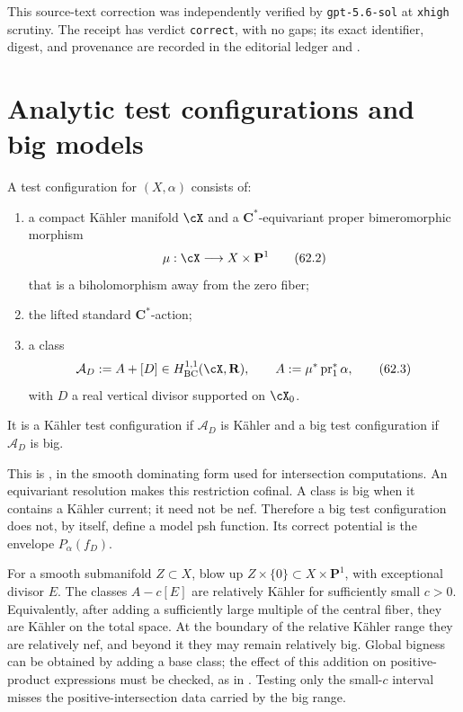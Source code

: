 This source-text correction was independently verified by
\texttt{gpt-5.6-sol} at \texttt{xhigh} scrutiny.  The receipt has verdict
\texttt{correct}, with no gaps; its exact identifier, digest, and provenance
are recorded in the editorial ledger and .

\section{Analytic test configurations and big models}
\label{sec:mpwn-k-models}

\begin{definition}
\label{def:mpwn-analytic-test-configuration}
A test configuration for $(X,\alpha)$ consists of:
\begin{enumerate}
\item a compact K\"ahler manifold $\cX$ and a
      $\mathbf C^*$-equivariant proper bimeromorphic morphism
      \[
            \mu:\cX\longrightarrow X\times\mathbf P^1
      \tag{62.2}\label{eq:mpwn-model-map}
      \]
      that is a biholomorphism away from the zero fiber;
\item the lifted standard $\mathbf C^*$-action;
\item a class
      \[
                 \mathcal A_D:=A+[D]\in H^{1,1}_{\mathrm{BC}}(\cX,\mathbf R),
          \qquad A:=\mu^*\operatorname{pr}_1^*\alpha,
      \tag{62.3}\label{eq:mpwn-model-class}
      \]
      with $D$ a real vertical divisor supported on $\cX_0$.
\end{enumerate}
It is a K\"ahler test configuration if $\mathcal A_D$ is K\"ahler and a big
test configuration if $\mathcal A_D$ is big.
\end{definition}

This is \cite[Definition~1.1.1]{MPWN25}, in the smooth dominating form used
for intersection computations.  An equivariant resolution makes this
restriction cofinal.  A class is big when it contains a K\"ahler current;
it need not be nef.  Therefore a big test configuration does not, by
itself, define a model psh function.  Its correct potential is the envelope
$P_\alpha(f_D)$.

\noindent\begin{minipage}{\linewidth}
\begin{example}
\label{ex:mpwn-dnc-stability}
For a smooth submanifold $Z\subset X$, blow up
$Z\times\{0\}\subset X\times\mathbf P^1$, with exceptional divisor $E$.
The classes $A-c[E]$ are relatively K\"ahler for sufficiently small
$c>0$.  Equivalently, after adding a sufficiently large multiple of the
central fiber, they are K\"ahler on the total space.  At the boundary of
the relative K\"ahler range they are relatively nef, and beyond it they
may remain relatively big.  Global bigness can be obtained by adding
a base class; the effect of this addition on positive-product expressions
must be checked, as in .
Testing only the small-$c$ interval misses the positive-intersection
data carried by the big range.
\end{example}
\end{minipage}\par

